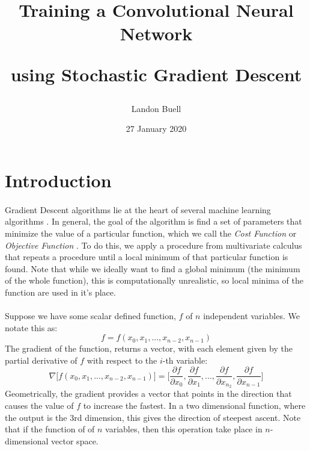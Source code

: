 \documentclass[12pt,letterpaper]{article}
\begin{document}

\title{
\begin{Huge}
Training a Convolutional Neural Network \\
\end{Huge} 
\Large using Stochastic Gradient Descent}
\author{Landon Buell}
\date{27 January 2020}
\maketitle


\section{Introduction}
\paragraph*{}Gradient Descent algorithms lie at the heart of several machine learning algorithms \cite{Goodfellow}. In general, the goal of the algorithm is find a set of parameters that minimize the value of a particular function, which we call the \textit{Cost Function} or \textit{Objective Function} \cite{Gareth}. To do this, we apply a procedure from multivariate calculus that repeats a procedure until a local minimum of that particular function is found. Note that while we ideally want to find a global minimum (the minimum of the whole function), this is computationally unrealistic, so local minima of the function are used in it's place. 
\paragraph*{}Suppose we have some scalar defined function, $f$ of $n$ independent variables. We notate this as:
\begin{equation}
\label{f}
f = f(x_0,x_1,...,x_{n-2},x_{n-1})
\end{equation}
The gradient of the function, returns a vector, with each element given by the partial derivative of $f$ with respect to the $i$-th variable:
\begin{equation}
\label{grad f}
\nabla \big[ f(x_0,x_1,...,x_{n-2},x_{n-1}) \big] =
\Big[ \frac{\partial f}{\partial x_0} , \frac{\partial f}{\partial x_1} , ... ,
\frac{\partial f}{\partial x_{n_2}} , \frac{\partial f}{\partial x_{n-1}} \Big]
\end{equation}
Geometrically, the gradient provides a vector that points in the direction that causes the value of $f$ to increase the fastest. In a two dimensional function, where the output is the 3rd dimension, this gives the direction of steepest ascent. Note that if the function of of $n$ variables, then this operation take place in $n$-dimensional vector space.
\end{document}
